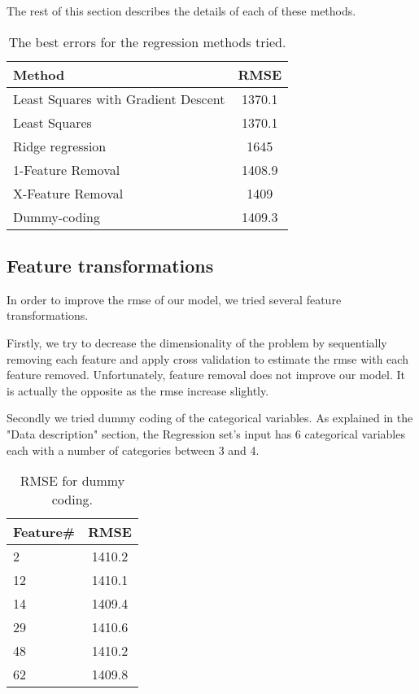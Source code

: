 \documentclass{article} %
\begin{document}
The rest of this section describes the details of each of these methods.
\begin{table}[h]
	\begin{center}
		\begin{tabular}{l|c}
			Method & RMSE  \\
			\hline
			Least Squares with Gradient Descent & 1370.1   \\
			Least Squares & 1370.1  \\
			Ridge regression &  1645 \\
			1-Feature Removal &  1408.9 \\
			X-Feature Removal &  1409 \\
			Dummy-coding &  1409.3 \\
		\end{tabular}
		\caption{The best errors for the regression methods tried.}
		\label{tab:regression-errors}
	\end{center}
\end{table}


\subsection{Feature transformations}
In order to improve the rmse of our model, we tried several feature transformations.

Firstly, we try to decrease the dimensionality of the problem by sequentially removing each feature and apply cross validation to estimate the rmse with each feature removed.
Unfortunately, feature removal does not improve our model. It is actually the opposite as the rmse increase slightly.

Secondly we tried dummy coding of the categorical variables.
As explained in the "Data description" section, the Regression set's input has 6 categorical variables each with a number of categories between 3 and 4.

\begin{table}[h]
	\begin{center}
		\begin{tabular}{l|c}
			Feature\# & RMSE  \\
			\hline
			2 &  1410.2 \\
			12 & 1410.1 \\
			14 &  1409.4 \\
			29 &  1410.6 \\
			48 &  1410.2 \\
			62 &  1409.8 \\
		\end{tabular}
		\caption{RMSE for dummy coding.}
		\label{tab:regression-dummy}
	\end{center}
\end{table}
\end{document}
